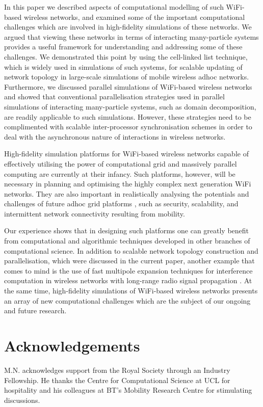 \documentclass{elsart}
\begin{document}
In this paper we described  aspects of computational modelling 
of such WiFi-based wireless networks, and examined some of the important 
computational challenges which are involved in high-fidelity  
simulations of these networks. 
We argued  that viewing these networks in terms of interacting many-particle 
systems provides a useful framework for understanding and addressing some 
of these challenges. We demonstrated this point by using the cell-linked list 
technique, which is widely used in simulations of such systems, 
for scalable updating of network topology in 
large-scale simulations of mobile wireless adhoc networks. Furthermore, we discussed parallel simulations of WiFi-based wireless networks and 
showed  that conventional parallelisation  strategies  used in parallel
simulations of interacting many-particle systems, such as domain decomposition, are 
readily applicable  to such simulations.  
However, these strategies need to be complimented with 
scalable inter-processor synchronisation schemes in order to deal with 
the asynchronous nature of interactions in wireless networks. 

High-fidelity simulation platforms for  
WiFi-based wireless networks capable of 
effectively  utilising the 
power of computational grid and massively parallel computing are currently at their 
infancy. Such platforms, however, will be  necessary in 
planning  and optimising the highly complex next generation   
WiFi networks. They are also important in realistically analysing the 
potentials and challenges of future adhoc grid platforms
\cite{wgrid1,wgrid2}, such as security, scalability, and  
intermittent network connectivity resulting from mobility.

Our experience 
shows that in designing such platforms one can greatly benefit from 
computational and algorithmic techniques developed in other
branches of computational science. In addition to scalable  
network topology construction and 
parallelisation, which were discussed in the current paper, another 
example that comes to mind is the use of
fast multipole expansion techniques for  interference 
computation in wireless networks with long-range radio signal propagation
\cite{mmp}. At the same time, high-fidelity simulations of WiFi-based 
wireless networks presents an array of new computational challenges 
which are the subject of our ongoing and future research. 

\label{conclusions}
\section*{Acknowledgements}
M.N. acknowledges support from the Royal Society
through an Industry Fellowship. He thanks the Centre for 
Computational Science at UCL for hospitality and his colleagues at BT's
Mobility Research Centre for stimulating discussions.
\end{document}
